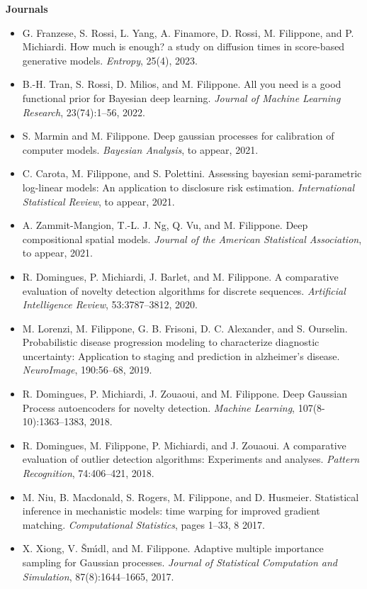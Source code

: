 \textbf{Journals}\begin{itemize}\item  G. Franzese, S. Rossi, L. Yang, A. Finamore, D. Rossi, M. Filippone, and P. Michiardi. How much is enough? a study on diffusion times in score-based generative models. \emph{Entropy}, 25(4), 2023.  
\item  B.-H. Tran, S. Rossi, D. Milios, and M. Filippone. All you need is a good functional prior for Bayesian deep learning. \emph{Journal of Machine Learning Research}, 23(74):1--56, 2022.  
\item  S. Marmin and M. Filippone. Deep gaussian processes for calibration of computer models. \emph{Bayesian Analysis}, to appear, 2021.  
\item  C. Carota, M. Filippone, and S. Polettini. Assessing bayesian semi-parametric log-linear models: An application to disclosure risk estimation. \emph{International Statistical Review}, to appear, 2021.  
\item  A. Zammit-Mangion, T.-L. J. Ng, Q. Vu, and M. Filippone. Deep compositional spatial models. \emph{Journal of the American Statistical Association}, to appear, 2021.  
\item  R. Domingues, P. Michiardi, J. Barlet, and M. Filippone. A comparative evaluation of novelty detection algorithms for discrete sequences. \emph{Artificial Intelligence Review}, 53:3787--3812, 2020.  
\item  M. Lorenzi, M. Filippone, G. B. Frisoni, D. C. Alexander, and S. Ourselin. Probabilistic disease progression modeling to characterize diagnostic uncertainty: Application to staging and prediction in alzheimer's disease. \emph{NeuroImage}, 190:56--68, 2019.  
\item  R. Domingues, P. Michiardi, J. Zouaoui, and M. Filippone. Deep Gaussian Process autoencoders for novelty detection. \emph{Machine Learning}, 107(8-10):1363--1383, 2018.  
\item  R. Domingues, M. Filippone, P. Michiardi, and J. Zouaoui. A comparative evaluation of outlier detection algorithms: Experiments and analyses. \emph{Pattern Recognition}, 74:406--421, 2018.  
\item  M. Niu, B. Macdonald, S. Rogers, M. Filippone, and D. Husmeier. Statistical inference in mechanistic models: time warping for improved gradient matching. \emph{Computational Statistics}, pages 1--33, 8 2017.  
\item  X. Xiong, V. Šm\'{\i}dl, and M. Filippone. Adaptive multiple importance sampling for Gaussian processes. \emph{Journal of Statistical Computation and Simulation}, 87(8):1644--1665, 2017.  

\end{itemize}
